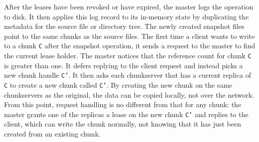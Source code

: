 \documentclass{article}
\begin{document}
After the leases have been revoked or have expired, the master logs the
operation to disk. It then applies this log record to its in-memory state by
duplicating the metadata for the source file or directory tree. The newly
created snapshot files point to the same chunks as the source files.  The first
time a client wants to write to a chunk \texttt{C} after the snapshot operation, it sends
a request to the master to find the current lease holder. The master notices
that the reference count for chunk \texttt{C} is greater than one. It defers replying to
the client request and instead picks a new chunk handle \texttt{C’}. 
It then asks each chunkserver that has a current replica of \texttt{C} to create a new
chunk called \texttt{C’}. By creating the new chunk on the same chunkservers as the
original, the data can be copied locally, not over the
network.  From this point, request handling is no different from that for any chunk: the
master grants one of the replicas a lease on the new chunk \texttt{C’} and
replies to the client, which can write the chunk normally, not knowing that it
has just been created from an existing chunk.



\nocite{*}
\end{document}
